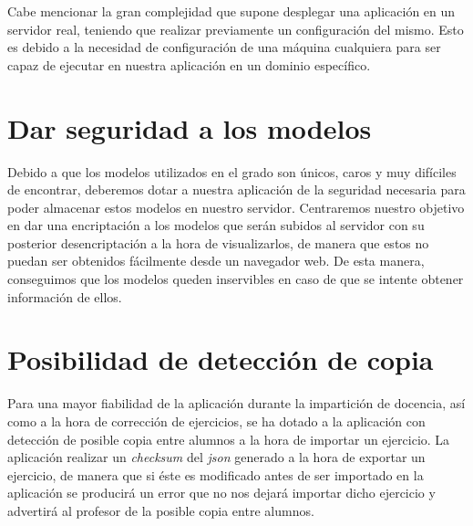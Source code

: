 Cabe mencionar la gran complejidad que supone desplegar una aplicación en un servidor real, teniendo que realizar previamente un configuración del mismo. Esto es debido a la necesidad de configuración de una máquina cualquiera para ser capaz de ejecutar en nuestra aplicación en un dominio específico.

\section{Dar seguridad a los modelos}
Debido a que los modelos utilizados en el grado son únicos, caros y muy difíciles de encontrar, deberemos dotar a nuestra aplicación de la seguridad necesaria para poder almacenar estos modelos en nuestro servidor. Centraremos nuestro objetivo en dar una encriptación a los modelos que serán subidos al servidor con su posterior desencriptación a la hora de visualizarlos, de manera que estos no puedan ser obtenidos fácilmente desde un navegador web. De esta manera, conseguimos que los modelos queden inservibles en caso de que se intente obtener información de ellos.

\section{Posibilidad de detección de copia}
Para una mayor fiabilidad de la aplicación durante la impartición de docencia, así como a la hora de corrección de ejercicios, se ha dotado a la aplicación con detección de posible copia entre alumnos a la hora de importar un ejercicio. La aplicación realizar un \textit{checksum} del \textit{json} generado a la hora de exportar un ejercicio, de manera que si éste es modificado antes de ser importado en la aplicación se producirá un error que no nos dejará importar dicho ejercicio y advertirá al profesor de la posible copia entre alumnos.